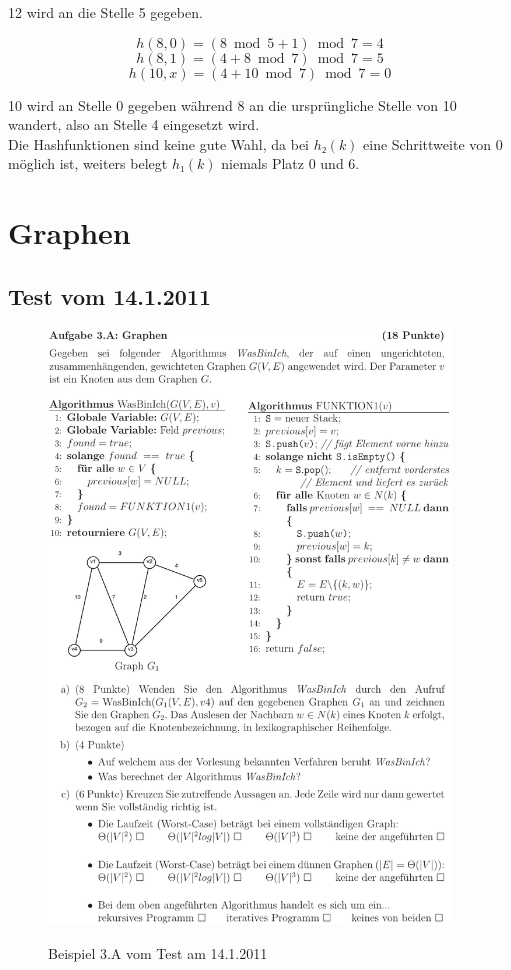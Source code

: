 \documentclass[a4paper, 12pt]{article}
\begin{document}
12 wird an die Stelle 5 gegeben.

\[ 
	h\left(8, 0 \right) = 
	\left( 8 \bmod{5} +1 \right) \bmod{7} = 4
\]
\[ 
	h\left(8, 1 \right) = 
	\left( 4 + 8 \bmod{7} \right) \bmod{7} = 5
\]
\[ 
	h\left(10, x \right) = 
	\left( 4 + 10 \bmod{7} \right) \bmod{7} = 0
\]

10 wird an Stelle 0 gegeben während 8 an die ursprüngliche Stelle von 10 wandert, also an Stelle 4 eingesetzt wird.\\

Die Hashfunktionen sind keine gute Wahl, da bei $h₂\left(k\right)$ eine Schrittweite von 0 möglich ist, weiters belegt $h₁\left(k\right)$ niemals Platz 0 und 6.

\section{Graphen}

\subsection{Test vom 14.1.2011}

\begin{figure}[htbp]
	\caption{Beispiel 3.A vom Test am 14.1.2011}
	\vskip 0.2cm
	\centering
	\includegraphics[width=0.95\textwidth]{Figures/Test_2011-01-14_3A}
	\label{figure:Test_2011-01-14_3A}
\end{figure}
\end{document}
